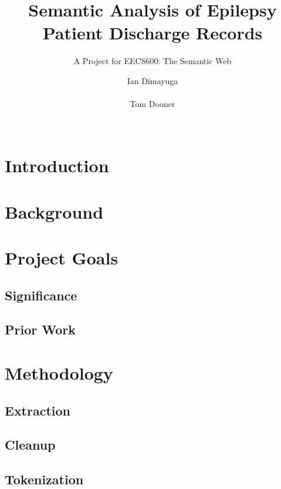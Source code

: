 \documentclass{acm_proc_article-sp}
\begin{document}
\title{Semantic Analysis of Epilepsy Patient Discharge Records}
\subtitle{A Project for EECS600: The Semantic Web}
\author{
\alignauthor Ian Dimayuga \\
    \\
\alignauthor Tom Dooner \\
    \\
}
\maketitle
\begin{abstract}
\end{abstract}

\section{Introduction}
\section{Background}

\section{Project Goals}
\subsection{Significance}
\subsection{Prior Work}

\section{Methodology}
\subsection{Extraction}
\subsection{Cleanup}
\subsection{Tokenization}
\end{document}
